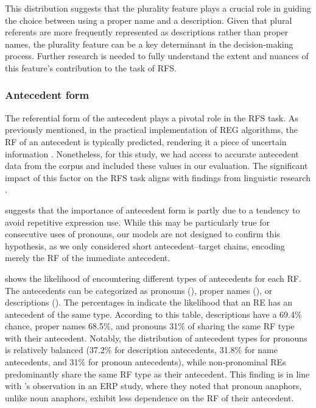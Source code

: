 

This distribution suggests that the plurality feature plays a crucial role in guiding the choice between using a proper name and a description. Given that plural referents are more frequently represented as descriptions rather than proper names, the plurality feature can be a key determinant in the \context decision-making process. Further research is needed to fully understand the extent and nuances of this feature's contribution to the task of RFS.



\subsubsection{Antecedent form}

The referential form of the antecedent plays a pivotal role in the RFS task. As previously mentioned, in the practical implementation of REG algorithms, the RF of an antecedent is typically predicted, rendering it a piece of uncertain information \citep{bohnet2008g}. Nonetheless, for this study, we had access to accurate antecedent data from the corpus and included these values in our evaluation. The significant impact of this factor on the RFS task aligns with findings from linguistic research \citep{kaiser2003word,gundel2008reference,Brilmayer2021}.

\citet{bohnet2008g} suggests that the importance of antecedent form is partly due to a tendency to avoid repetitive expression use. While this may be particularly true for consecutive uses of pronouns, our models are not designed to confirm this hypothesis, as we only considered short antecedent--target chains, encoding merely the RF of the immediate antecedent.



 shows the likelihood of encountering different types of antecedents for each RF. The antecedents can be categorized as pronouns (), proper names (), or descriptions (). The percentages in  indicate the likelihood that an RE has an antecedent of the same type. According to this table, descriptions have a 69.4\% chance, proper names 68.5\%, and pronouns 31\% of sharing the same RF type with their antecedent. Notably, the distribution of antecedent types for pronouns is relatively balanced (37.2\% for description antecedents, 31.8\% for name antecedents, and 31\% for pronoun antecedents), while non-pronominal REs predominantly share the same RF type as their antecedent. This finding is in line with \citet{Brilmayer2021}'s observation in an ERP study, where they noted that pronoun anaphors, unlike noun anaphors, exhibit less dependence on the RF of their antecedent.


